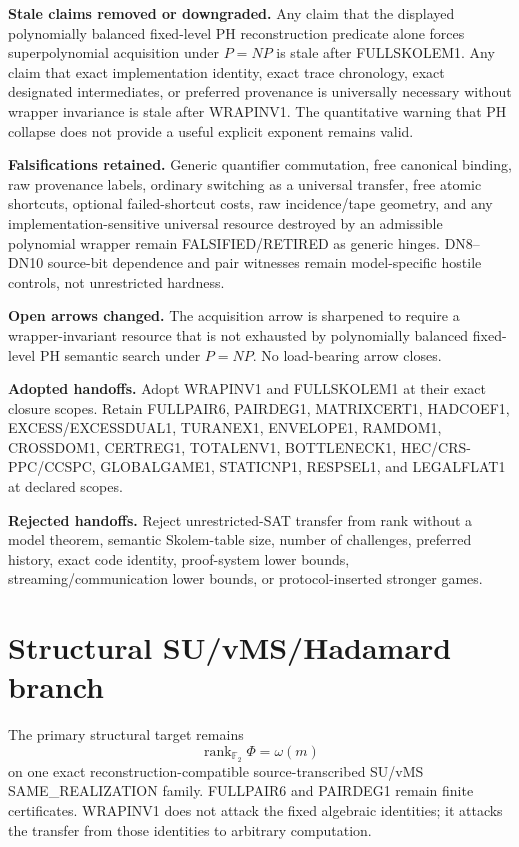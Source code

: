 \documentclass[11pt]{article}
\begin{document}
\textbf{Stale claims removed or downgraded.}
Any claim that the displayed polynomially balanced fixed-level PH reconstruction predicate alone forces superpolynomial acquisition under \(P=NP\) is stale after FULLSKOLEM1. Any claim that exact implementation identity, exact trace chronology, exact designated intermediates, or preferred provenance is universally necessary without wrapper invariance is stale after WRAPINV1. The quantitative warning that PH collapse does not provide a useful explicit exponent remains valid.

\textbf{Falsifications retained.}
Generic quantifier commutation, free canonical binding, raw provenance labels, ordinary switching as a universal transfer, free atomic shortcuts, optional failed-shortcut costs, raw incidence/tape geometry, and any implementation-sensitive universal resource destroyed by an admissible polynomial wrapper remain FALSIFIED/RETIRED as generic hinges. DN8--DN10 source-bit dependence and pair witnesses remain model-specific hostile controls, not unrestricted hardness.

\textbf{Open arrows changed.}
The acquisition arrow is sharpened to require a wrapper-invariant resource that is not exhausted by polynomially balanced fixed-level PH semantic search under \(P=NP\). No load-bearing arrow closes.

\textbf{Adopted handoffs.}
Adopt WRAPINV1 and FULLSKOLEM1 at their exact closure scopes. Retain FULLPAIR6, PAIRDEG1, MATRIXCERT1, HADCOEF1, EXCESS/EXCESSDUAL1, TURANEX1, ENVELOPE1, RAMDOM1, CROSSDOM1, CERTREG1, TOTALENV1, BOTTLENECK1, HEC/CRS-PPC/CCSPC, GLOBALGAME1, STATICNP1, RESPSEL1, and LEGALFLAT1 at declared scopes.

\textbf{Rejected handoffs.}
Reject unrestricted-SAT transfer from rank without a model theorem, semantic Skolem-table size, number of challenges, preferred history, exact code identity, proof-system lower bounds, streaming/communication lower bounds, or protocol-inserted stronger games.

\section*{Structural SU/vMS/Hadamard branch}
The primary structural target remains
\[
\boxed{\operatorname{rank}_{\mathbb F_2}\Phi=\omega(m)}
\]
on one exact reconstruction-compatible source-transcribed SU/vMS SAME\_REALIZATION family. FULLPAIR6 and PAIRDEG1 remain finite certificates. WRAPINV1 does not attack the fixed algebraic identities; it attacks the transfer from those identities to arbitrary computation.
\end{document}
